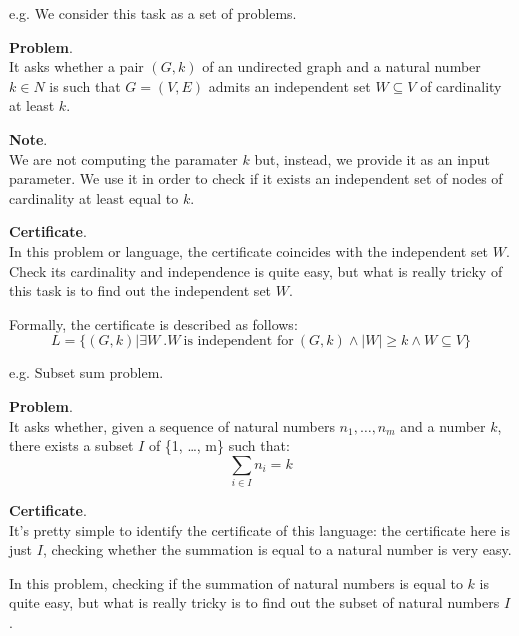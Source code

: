 \begin{example}[title = Minimum independent set]
    e.g. We consider this task as a set of problems. \vspace{7pt}

    \textbf{Problem}. \\
    It asks whether a pair $(G, k)$ of an undirected graph and a natural number $k \in N$ is such that $G = (V, E)$ admits an independent set $W \subseteq V$ of 
    cardinality at least $k$. \vspace{7pt}

    \textbf{Note}. \\ 
    We are not computing the paramater $k$ but, instead, we provide it as an input parameter. We use it in order to check if it exists an independent set 
    of nodes of cardinality at least equal to $k$. \vspace{7pt}

    \textbf{Certificate}. \\ 
    In this problem or language, the certificate coincides with the independent set $W$. Check its cardinality and independence is quite easy, but what is really 
    tricky of this task is to find out the independent set $W$. \vspace{7pt}

    Formally, the certificate is described as follows:
    $$L = \{(G,k)| \exists W \ . W \ \text{is independent for} \ (G,k) \wedge |W| \geq k \wedge W \subseteq V\}$$
\end{example}
\begin{example}[title = Subset sum]
    e.g. Subset sum problem. \vspace{7pt}

    \textbf{Problem}. \\ 
    It asks whether, given a sequence of natural numbers $n_1, \dots, n_m$ and a number $k$, there exists a subset $I$ of \{1, \dots, m\} such that:
    $$ \sum_{i \in I} n_i = k $$ 

    \textbf{Certificate}. \\ 
    It's pretty simple to identify the certificate of this language: the certificate here is just $I$, checking whether the summation is equal to a natural number
    is very easy. \vspace{7pt}

    In this problem, checking if the summation of natural numbers is equal to $k$ is quite easy, but what is really tricky is to find out the subset of 
    natural numbers $I$.
\end{example}
